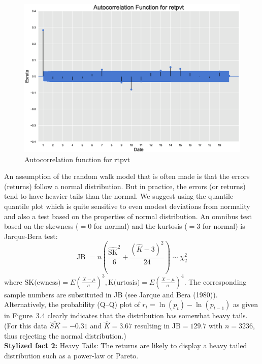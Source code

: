 	\begin{figure}[!ht]
	\centering
	\includegraphics[width=\textwidth]{chapters/chapter_uvts/figures/Sec2-4Fig5.eps}
	\caption{Autocorrelation function for rtpvt \label{fig:autocorrtpvt}}
	\end{figure}
An assumption of the random walk model that is often made is that the errors (returns)
follow a normal distribution. But in practice, the errors (or returns) tend to have heavier tails than the normal. We suggest using the quantile-quantile plot which is quite sensitive to even modest deviations from normality and also a test based on the properties of normal distribution. An omnibus test based on the skewness ($=0$ for normal) and the kurtosis ($=3$ for normal) is Jarque-Bera test:
	\begin{equation}\label{eqn:2JB}
	\text{JB }= n\left(\frac{\widehat{\text{SK}}^2}{6} + \frac{(\hat{K} - 3)^2}{24}\right) \sim \chi_2^2
	\end{equation}
where $\text{SK}\text{(ewness)}= E(\frac{X-\mu}{\sigma})^3, \text{K}\text{(urtosis)} = E(\frac{X-\mu}{\sigma})^4$. The corresponding sample numbers are substituted in JB (see Jarque and Bera (1980)\cite{jarque80}). Alternatively, the probability (Q--Q) plot of $r_t = \ln{(p_t)} - \ln{(p_{t-1})}$ as given in Figure~3.4 clearly indicates that the distribution has somewhat heavy tails. (For this data $\widehat{SK} = -0.31$ and $\hat{K} = 3.67$ resulting in $\text{JB}= 129.7$ with $n= 3236$, thus rejecting the normal distribution.) \\


\noindent\textbf{Stylized fact 2:} Heavy Tails: The returns are likely to display a heavy
tailed distribution such as a power-law or Pareto. \\


